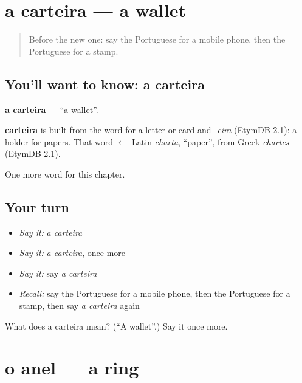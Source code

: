 \section[a carteira]{a carteira — a wallet}

\label{lesson:PT-C100-carteira}



\begin{quote}
Before the new one: say the Portuguese for a mobile phone, then the Portuguese for a stamp.
\end{quote}

\subsection*{You'll want to know: a carteira}
\textbf{a carteira} — \textquotedblleft{}a wallet\textquotedblright{}.

\begin{cousinweb}
\textbf{carteira} is built from the word for a letter or card and \emph{-eira} (EtymDB 2.1): a holder for papers. That word $\leftarrow$ Latin \emph{charta}, \textquotedblleft{}paper\textquotedblright{}, from Greek \emph{chartēs} (EtymDB 2.1).
\end{cousinweb}

\begin{grammarlens}[title={What you've built}]
One more word for this chapter.
\end{grammarlens}

\subsection*{Your turn}
\begin{itemize}
\raggedright
  \item \emph{Say it:} \emph{a carteira}
  \item \emph{Say it:} \emph{a carteira}, once more
  \item \emph{Say it:} say \emph{a carteira}
  \item \emph{Recall:} say the Portuguese for a mobile phone, then the Portuguese for a stamp, then say \emph{a carteira} again
\end{itemize}

\begin{tcolorbox}[breakable,colback=teal!4,colframe=teal!35!black,title={Before you move on}]
What does a carteira mean? (\textquotedblleft{}A wallet\textquotedblright{}.) Say it once more.
\end{tcolorbox}
\section[o anel]{o anel — a ring}

